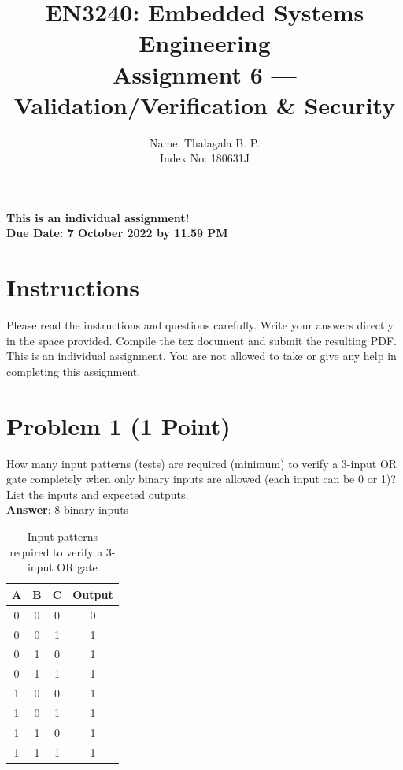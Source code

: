 \documentclass[11pt,letterpaper]{article}
\begin{document}
	
	\title{EN3240: Embedded Systems Engineering \\Assignment 6 --- Validation/Verification \& Security}
	
	\author{Name: Thalagala B. P. \\ Index No: 180631J}
	
	\maketitle
	
	\begin{center}
		\color{red}\bf This is an individual assignment! \\ Due Date: 7 October 2022 by 11.59 PM
	\end{center}
	
	\section*{Instructions}
	
	Please read the instructions and questions carefully. Write your answers directly in the space provided. Compile the tex document and submit the resulting PDF. This is an individual assignment. You are not allowed to take or give any help in completing this assignment.
	
	\newpage
	
	\section*{Problem 1 (1 Point)}
	
	How many input patterns (tests) are required (minimum) to verify a 3-input OR gate completely when only binary inputs are allowed (each input can be 0 or 1)? List the inputs and expected outputs.\\
	
	\textbf{\Large Answer}: 8 binary inputs
	
	\begin{table}[H]
		\centering
		\begin{tabular}{|c |c | c | c|}
			\hline
			A & B & C & Output\\ \hline
			0 & 0 & 0 & 0 \\ \hline
			0 & 0 & 1 & 1 \\ \hline
			0 & 1 & 0 & 1 \\ \hline
			0 & 1 & 1 & 1 \\ \hline
			1 & 0 & 0 & 1 \\ \hline
			1 & 0 & 1 & 1 \\ \hline
			1 & 1 & 0 & 1 \\ \hline
			1 & 1 & 1 & 1 \\ \hline\hline
		\end{tabular}
	\caption{Input patterns required to verify a 3-input OR gate}
	\end{table}
	
\end{document}
